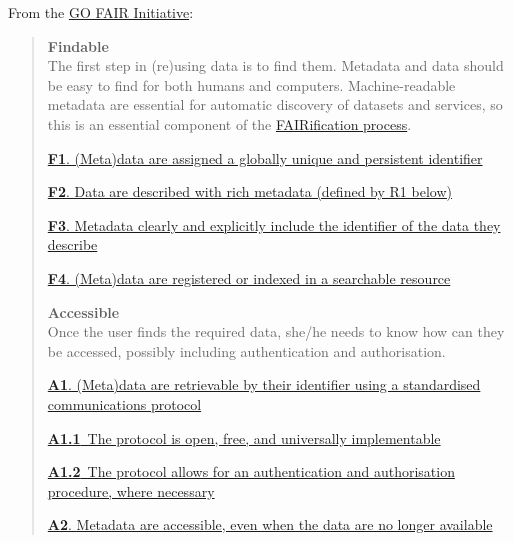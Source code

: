 \documentclass[
]{book}
\begin{document}
From the \href{https://www.go-fair.org/fair-principles/}{GO FAIR Initiative}:

\begin{quote}
\textbf{Findable}\\
The first step in (re)using data is to find them. Metadata and data should be easy to find for both humans and computers. Machine-readable metadata are essential for automatic discovery of datasets and services, so this is an essential component of the \href{https://www.go-fair.org/fair-principles/fairification-process/}{FAIRification process}.

\href{https://www.go-fair.org/fair-principles/fair-data-principles-explained/f1-meta-data-assigned-globally-unique-persistent-identifiers/}{\textbf{F1}. (Meta)data are assigned a globally unique and persistent identifier}

\href{https://www.go-fair.org/fair-principles/fair-data-principles-explained/f2-data-described-rich-metadata/}{\textbf{F2}. Data are described with rich metadata (defined by R1 below)}

\href{https://www.go-fair.org/fair-principles/f3-metadata-clearly-explicitly-include-identifier-data-describe/}{\textbf{F3}. Metadata clearly and explicitly include the identifier of the data they describe}

\href{https://www.go-fair.org/fair-principles/f4-metadata-registered-indexed-searchable-resource/}{\textbf{F4}. (Meta)data are registered or indexed in a searchable resource}

\textbf{Accessible}\\
Once the user finds the required data, she/he needs to know how can they be accessed, possibly including authentication and authorisation.

\href{https://www.go-fair.org/fair-principles/542-2/}{\textbf{A1}. (Meta)data are retrievable by their identifier using a standardised communications protocol}

\href{https://www.go-fair.org/fair-principles/a1-1-protocol-open-free-universally-implementable/}{\textbf{A1.1}~The protocol is open, free, and universally implementable}

\href{https://www.go-fair.org/fair-principles/a1-2-protocol-allows-authentication-authorisation-required/}{\textbf{A1.2}~The protocol allows for an authentication and authorisation procedure, where necessary}

\href{https://www.go-fair.org/fair-principles/a2-metadata-accessible-even-data-no-longer-available/}{\textbf{A2}. Metadata are accessible, even when the data are no longer available}


\end{quote}
\end{document}
